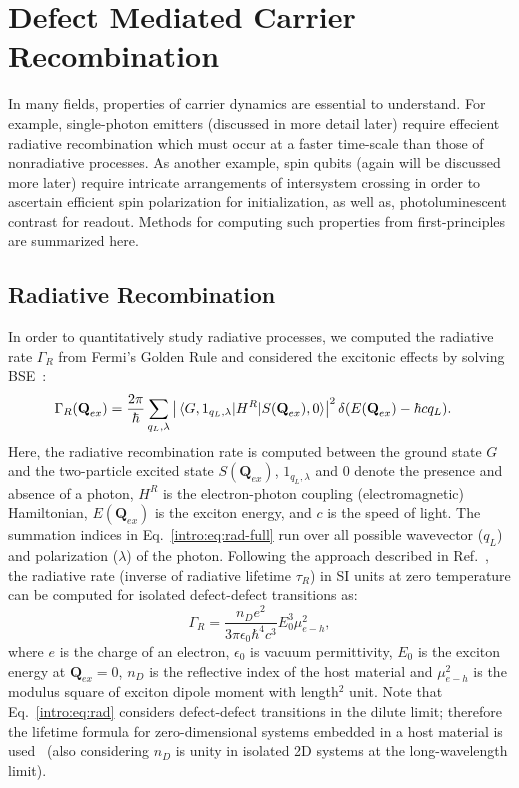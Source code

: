 \section{Defect Mediated Carrier Recombination}

In many fields, properties of carrier dynamics are essential to understand. For example, single-photon emitters (discussed in more detail later) require effecient radiative recombination which must occur at a faster time-scale than those of nonradiative processes. As another example, spin qubits (again will be discussed more later) require intricate arrangements of intersystem crossing in order to ascertain efficient spin polarization for initialization, as well as, photoluminescent contrast for readout. Methods for computing such properties from first-principles are summarized here.

\subsection{Radiative Recombination}
In order to quantitatively study radiative processes, we computed the radiative rate $\Gamma_R$ from Fermi's Golden Rule and considered the excitonic effects by solving BSE~\cite{wu2019dimensionality}:
\begin{align}
    \Gamma_R (\textbf{Q}_{ex}) &=
    \frac{2\pi}{\hbar}
    \sum_{q_L, \lambda}
    \left|
        \mel{G,1_{q_L,\lambda}}
        {H^R}
        {S(\textbf{Q}_{ex}),0}
    \right|^2
    \delta(E(\textbf{Q}_{ex}) -\hbar c q_L).
    \label{intro:eq:rad-full}
\end{align}
Here, the radiative recombination rate is computed between the ground state $G$ and the two-particle excited state $S(\textbf{Q}_{ex})$, $1_{q_L,\lambda}$ and 0 denote the presence and absence of a photon, $H^R$ is the electron-photon coupling (electromagnetic) Hamiltonian,  $E(\textbf{Q}_{ex})$ is the exciton energy, and $c$ is the speed of light.
The summation indices in Eq.~\ref{intro:eq:rad-full} run over all possible wavevector ($q_L$) and polarization ($\lambda$) of the photon.
Following the approach described in Ref.~\cite{wu2019dimensionality}, the radiative rate (inverse of radiative lifetime $\tau_R$) in SI units at zero temperature can be computed for isolated defect-defect transitions as:
\begin{equation}
     \Gamma_R = \frac{n_D e^2}{3\pi\epsilon_0\hbar^4 c^3} E_0^3 \mu_{e-h}^2,
    \label{intro:eq:rad}
\end{equation}
where $e$ is the charge of an electron, $\epsilon_0$ is vacuum permittivity, $E_0$ is the exciton energy at $\textbf{Q}_{ex}=0$, $n_D$ is the reflective index of the host material and $\mu_{e-h}^2$ is the modulus square of exciton dipole moment with length$^2$ unit. Note that Eq.~\ref{intro:eq:rad} considers defect-defect transitions in the dilute limit; therefore the lifetime formula for zero-dimensional systems embedded in a host material is used~\cite{gupta2018two,mackoit2019carbon} (also considering $n_D$ is unity in isolated 2D systems at the long-wavelength limit).


